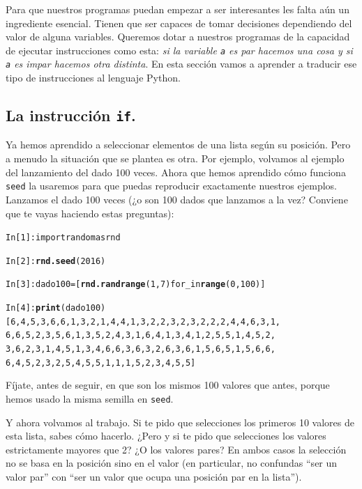 \documentclass[10pt,a4paper]{article}\usepackage[]{graphicx}\usepackage[]{color}
\makeatletter
\newcommand{\hlkwd}[1]{\textcolor[rgb]{0.737,0.353,0.396}{\textbf{#1}}}%
\newenvironment{kframe}{%
 \def\at@end@of@kframe{}%
 \ifinner\ifhmode%
  \def\at@end@of@kframe{\end{minipage}}%
  \begin{minipage}{\columnwidth}%
 \fi\fi%
 \def\FrameCommand##1{\hskip\@totalleftmargin \hskip-\fboxsep
 \colorbox{shadecolor}{##1}\hskip-\fboxsep
     \hskip-\linewidth \hskip-\@totalleftmargin \hskip\columnwidth}%
 \MakeFramed {\advance\hsize-\width
   \@totalleftmargin\z@ \linewidth\hsize
   \@setminipage}}%
 {\par\unskip\endMakeFramed%
 \at@end@of@kframe}
\newenvironment{knitrout}{}{} %
\makeatother
\begin{document}
Para que nuestros programas puedan empezar a ser interesantes les falta aún un ingrediente esencial. Tienen que ser capaces de tomar decisiones dependiendo del valor de alguna variables. Queremos dotar a nuestros programas de la capacidad de ejecutar instrucciones como esta: {\em si la variable {\tt a} es par hacemos una cosa y si {\tt a} es impar hacemos otra distinta}. En esta sección vamos a aprender a traducir ese tipo de instrucciones al lenguaje Python.

\subsection{La instrucción {\tt if}.}
\label{tut02:subsec:instruccionIf}

Ya hemos aprendido a seleccionar elementos de una lista según su posición. Pero a menudo la situación que se plantea es otra. Por ejemplo, volvamos al ejemplo del lanzamiento del dado 100 veces. Ahora que hemos aprendido cómo funciona {\tt seed} la usaremos para que puedas reproducir exactamente nuestros ejemplos. Lanzamos el dado 100 veces (¿o son 100 dados que lanzamos a la vez? Conviene que te vayas haciendo estas preguntas):
\begin{knitrout}
\color{fgcolor}\begin{kframe}
\begin{alltt}
In [1]: import random as rnd

In [2]: \hlkwd{rnd.seed}(2016)

In [3]: dado100 = [\hlkwd{rnd.randrange}(1, 7) for _ in \hlkwd{range}(0, 100)]

In [4]: \hlkwd{print}(dado100)
[6, 4, 5, 3, 6, 6, 1, 3, 2, 1, 4, 4, 1, 3, 2, 2, 3, 2, 3, 2, 2, 2, 4, 4, 6, 3, 1,
6, 6, 5, 2, 3, 5, 6, 1, 3, 5, 2, 4, 3, 1, 6, 4, 1, 3, 4, 1, 2, 5, 5, 1, 4, 5, 2,
3, 6, 2, 3, 1, 4, 5, 1, 3, 4, 6, 6, 3, 6, 3, 2, 6, 3, 6, 1, 5, 6, 5, 1, 5, 6, 6,
6, 4, 5, 2, 3, 2, 5, 4, 5, 5, 1, 1, 1, 5, 2, 3, 4, 5, 5]
\end{alltt}
\end{kframe}
\end{knitrout}
Fíjate, antes de seguir, en que son los mismos 100 valores que antes, porque hemos usado la misma semilla en {\tt seed}.

Y ahora volvamos al trabajo. Si te pido que selecciones los primeros 10 valores de esta lista, sabes cómo hacerlo. ¿Pero y si te pido que selecciones los valores estrictamente mayores que 2? ¿O los valores pares? En ambos casos la selección no se basa en la posición sino en el valor (en particular, no confundas ``ser un valor par'' con ``ser un valor que ocupa una posición par en la lista'').
\end{document}
